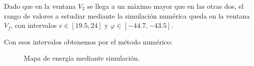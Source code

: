 \documentclass{article}
\begin{document}
Dado que en la ventana $V_2$ se llega a 
un máximo mayor que en las otras dos, el 
rango de valores a estudiar mediante 
la simulación numérica queda en la ventana 
$V_f$, con intervalos $v\in[19.5,24]$ y $\varphi\in[-44.7,-43.5]$.

\newpage
Con esos intervalos obtenemos por el método numérico:
\begin{figure}[ht]
    \centering
    \caption{Mapa de energía mediante simulación.}
\end{figure}



\newpage
\printbibliography
\end{document}

